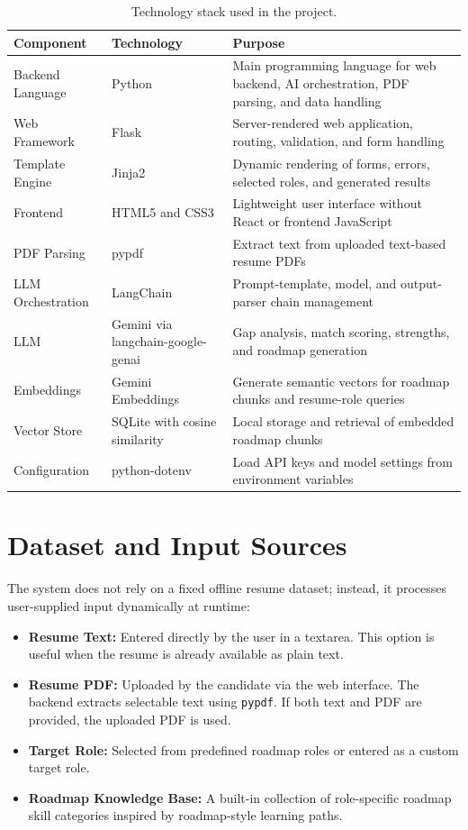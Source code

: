 \documentclass[12pt,a4paper]{report}
\begin{document}
\begin{table}[H]
\centering
\caption{Technology stack used in the project.}
\begin{tabular}{|p{3.5cm}|p{4cm}|p{5.5cm}|}
\hline
\textbf{Component} & \textbf{Technology} & \textbf{Purpose} \\
\hline
Backend Language & Python & Main programming language for web backend, AI orchestration, PDF parsing, and data handling \\
\hline
Web Framework & Flask & Server-rendered web application, routing, validation, and form handling \\
\hline
Template Engine & Jinja2 & Dynamic rendering of forms, errors, selected roles, and generated results \\
\hline
Frontend & HTML5 and CSS3 & Lightweight user interface without React or frontend JavaScript \\
\hline
PDF Parsing & pypdf & Extract text from uploaded text-based resume PDFs \\
\hline
LLM Orchestration & LangChain & Prompt-template, model, and output-parser chain management \\
\hline
LLM & Gemini via langchain-google-genai & Gap analysis, match scoring, strengths, and roadmap generation \\
\hline
Embeddings & Gemini Embeddings & Generate semantic vectors for roadmap chunks and resume-role queries \\
\hline
Vector Store & SQLite with cosine similarity & Local storage and retrieval of embedded roadmap chunks \\
\hline
Configuration & python-dotenv & Load API keys and model settings from environment variables \\
\hline
\end{tabular}
\end{table}

\section{Dataset and Input Sources}

The system does not rely on a fixed offline resume dataset; instead, it processes
user-supplied input dynamically at runtime:

\begin{itemize}
  \item \textbf{Resume Text:} Entered directly by the user in a textarea. This
        option is useful when the resume is already available as plain text.
  \item \textbf{Resume PDF:} Uploaded by the candidate via the web interface.
        The backend extracts selectable text using \texttt{pypdf}. If both text
        and PDF are provided, the uploaded PDF is used.
  \item \textbf{Target Role:} Selected from predefined roadmap roles or entered
        as a custom target role.
  \item \textbf{Roadmap Knowledge Base:} A built-in collection of role-specific
        roadmap skill categories inspired by roadmap-style learning paths.
\end{itemize}
\end{document}
